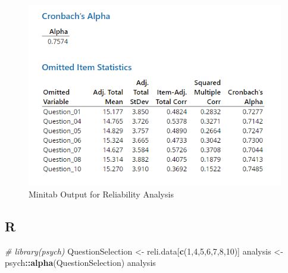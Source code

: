 \documentclass[
]{book}
\newenvironment{Shaded}{\begin{snugshade}}{\end{snugshade}}
\newcommand{\CommentTok}[1]{\textcolor[rgb]{0.56,0.35,0.01}{\textit{#1}}}
\newcommand{\DecValTok}[1]{\textcolor[rgb]{0.00,0.00,0.81}{#1}}
\newcommand{\KeywordTok}[1]{\textcolor[rgb]{0.13,0.29,0.53}{\textbf{#1}}}
\newcommand{\NormalTok}[1]{#1}
\newcommand{\OperatorTok}[1]{\textcolor[rgb]{0.81,0.36,0.00}{\textbf{#1}}}
\newcommand{\StringTok}[1]{\textcolor[rgb]{0.31,0.60,0.02}{#1}}
\begin{document}
\begin{figure}[!h]
\includegraphics{Screenshots/Reliability/ReliabilityMinitab2} \caption{\label{fig:reliMinitab2}Minitab Output for Reliability Analysis}\label{fig:reliMinitab2}
\end{figure}

\hypertarget{r}{%
\subsection{R}\label{r}}

\begin{Shaded}
\begin{Highlighting}[]
\CommentTok{# library(psych)}
\NormalTok{QuestionSelection <-}\StringTok{ }\NormalTok{reli.data[}\KeywordTok{c}\NormalTok{(}\DecValTok{1}\NormalTok{,}\DecValTok{4}\NormalTok{,}\DecValTok{5}\NormalTok{,}\DecValTok{6}\NormalTok{,}\DecValTok{7}\NormalTok{,}\DecValTok{8}\NormalTok{,}\DecValTok{10}\NormalTok{)]}
\NormalTok{analysis <-}\StringTok{ }\NormalTok{psych}\OperatorTok{::}\KeywordTok{alpha}\NormalTok{(QuestionSelection)}
\NormalTok{analysis}
\end{Highlighting}
\end{Shaded}
\end{document}
